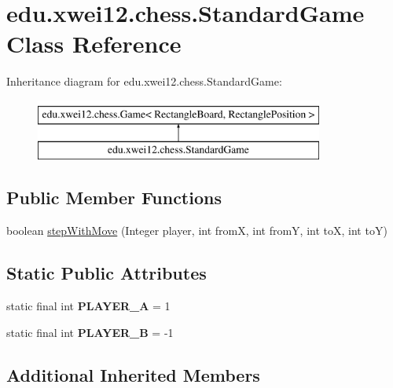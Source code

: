 \hypertarget{classedu_1_1xwei12_1_1chess_1_1_standard_game}{}\section{edu.\+xwei12.\+chess.\+Standard\+Game Class Reference}
\label{classedu_1_1xwei12_1_1chess_1_1_standard_game}
Inheritance diagram for edu.\+xwei12.\+chess.\+Standard\+Game\+:\begin{figure}[H]
\begin{center}
\leavevmode
\includegraphics[height=2.000000cm]{classedu_1_1xwei12_1_1chess_1_1_standard_game}
\end{center}
\end{figure}
\subsection*{Public Member Functions}
\begin{DoxyCompactItemize}
\item 
boolean \hyperlink{classedu_1_1xwei12_1_1chess_1_1_standard_game_a12bb21a8f25e113d1775be551edde233}{step\+With\+Move} (Integer player, int fromX, int fromY, int toX, int toY)
\end{DoxyCompactItemize}
\subsection*{Static Public Attributes}
\begin{DoxyCompactItemize}
\item 
static final int {\bfseries P\+L\+A\+Y\+E\+R\+\_\+A} = 1\hypertarget{classedu_1_1xwei12_1_1chess_1_1_standard_game_a1ce97a54be76cb25b9d1f2c6ade8d974}{}\label{classedu_1_1xwei12_1_1chess_1_1_standard_game_a1ce97a54be76cb25b9d1f2c6ade8d974}

\item 
static final int {\bfseries P\+L\+A\+Y\+E\+R\+\_\+B} = -\/1\hypertarget{classedu_1_1xwei12_1_1chess_1_1_standard_game_ada025f7928a6e9d12fda509072851e22}{}\label{classedu_1_1xwei12_1_1chess_1_1_standard_game_ada025f7928a6e9d12fda509072851e22}

\end{DoxyCompactItemize}
\subsection*{Additional Inherited Members}


